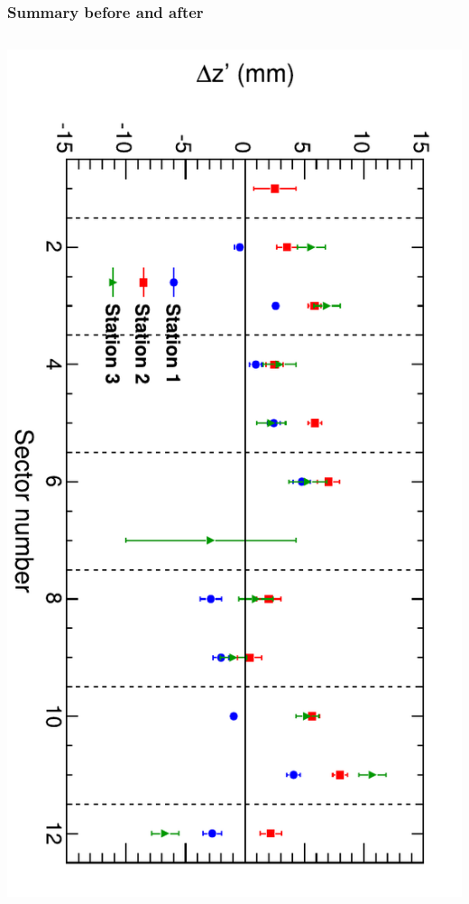 \documentclass[compress]{beamer}
\begin{document}
\begin{frame}
\frametitle{Summary before and after}
\label{after}

\begin{columns}
\includegraphics[height=\linewidth, angle=90]{zfits_stations.pdf}


\end{columns}
\end{frame}
\end{document}
